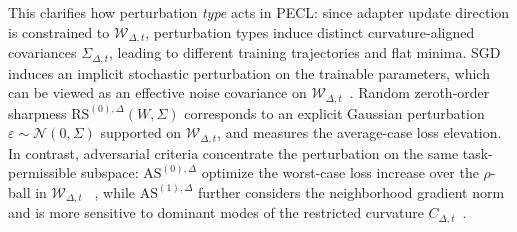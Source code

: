 \documentclass{article}
\theoremstyle{plain}
\theoremstyle{definition}
\theoremstyle{remark}
\begin{document}
This clarifies how perturbation \emph{type} acts in PECL: since adapter update direction is constrained to $\mathcal W_{\Delta,t}$, perturbation types induce distinct curvature-aligned covariances $\Sigma_{\Delta,t}$, leading to different training trajectories and flat minima. 
SGD induces an implicit stochastic perturbation on the trainable parameters, which can be viewed as an effective noise covariance on $\mathcal W_{\Delta,t}$~\cite{pmlr-v97-zhu19e}. Random zeroth-order sharpness $\mathrm{RS}^{(0),\Delta}(W,\Sigma)$ corresponds to an explicit Gaussian perturbation $\varepsilon\sim\mathcal N(0,\Sigma)$ supported on $\mathcal W_{\Delta,t}$, and measures the average-case loss elevation. In contrast, adversarial criteria concentrate the perturbation on the same task-permissible subspace: $\mathrm{AS}^{(0),\Delta}$ optimize the worst-case loss increase over the $\rho$-ball in $\mathcal W_{\Delta,t}$ ~\cite{foretSharpnessAwareMinimizationEfficiently2021}, while $\mathrm{AS}^{(1),\Delta}$ further considers the neighborhood gradient norm and is more sensitive to dominant modes of the restricted curvature $C_{\Delta,t}$~\cite{Zhang_GAM}. 
\end{document}

